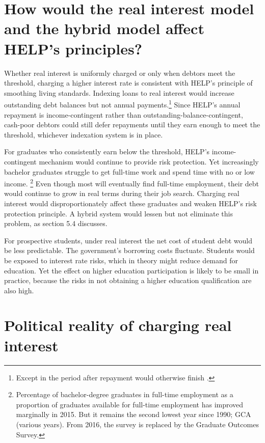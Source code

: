 \documentclass[]{book}
\begin{document}
\section{How would the real interest model and the hybrid model affect HELP's principles?}\label{how-would-the-real-interest-model-and-the-hybrid-model-affect-helps-principles}

Whether real interest is uniformly charged or only when debtors meet the threshold, charging a higher interest rate is consistent with HELP's principle of smoothing living standards. Indexing loans to real interest would increase outstanding debt balances but not annual payments.\footnote{Except in the period after repayment would otherwise finish .} Since HELP's annual repayment is income-contingent rather than outstanding-balance-contingent, cash-poor debtors could still defer repayments until they earn enough to meet the threshold, whichever indexation system is in place.

For graduates who consistently earn below the threshold, HELP's income-contingent mechanism would continue to provide risk protection. Yet increasingly bachelor graduates struggle to get full-time work and spend time with no or low income. \footnote{Percentage of bachelor-degree graduates in full-time employment as a proportion of graduates available for full-time employment has improved marginally in 2015. But it remains the second lowest year since 1990; GCA (various years). From 2016, the survey is replaced by the Graduate Outcomes Survey.} Even though most will eventually find full-time employment, their debt would continue to grow in real terms during their job search. Charging real interest would disproportionately affect these graduates and weaken HELP's risk protection principle. A hybrid system would lessen but not eliminate this problem, as section 5.4 discusses.

For prospective students, under real interest the net cost of student debt would be less predictable. The government's borrowing costs fluctuate. Students would be exposed to interest rate risks, which in theory might reduce demand for education. Yet the effect on higher education participation is likely to be small in practice, because the risks in not obtaining a higher education qualification are also high.

\section{Political reality of charging real interest}\label{political-reality-of-charging-real-interest}
\end{document}
